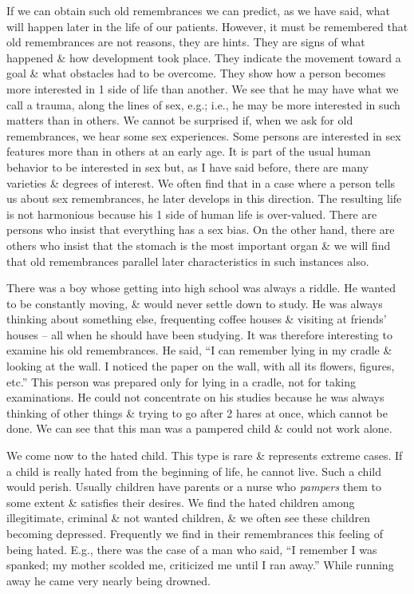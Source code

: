 \documentclass{article}
\numberwithin{equation}{section}
\begin{document}
If we can obtain such old remembrances we can predict, as we have said, what will happen later in the life of our patients. However, it must be remembered that old remembrances are not reasons, they are hints. They are signs of what happened \& how development took place. They indicate the movement toward a goal \& what obstacles had to be overcome. They show how a person becomes more interested in 1 side of life than another. We see that he may have what we call a trauma, along the lines of sex, e.g.; i.e., he may be more interested in such matters than in others. We cannot be surprised if, when we ask for old remembrances, we hear some sex experiences. Some persons are interested in sex features more than in others at an early age. It is part of the usual human behavior to be interested in sex but, as I have said before, there are many varieties \& degrees of interest. We often find that in a case where a person tells us about sex remembrances, he later develops in this direction. The resulting life is not harmonious because his 1 side of human life is over-valued. There are persons who insist that everything has a sex bias. On the other hand, there are others who insist that the stomach is the most important organ \& we will find that old remembrances parallel later characteristics in such instances also.

There was a boy whose getting into high school was always a riddle. He wanted to be constantly moving, \& would never settle down to study. He was always thinking about something else, frequenting coffee houses \& visiting at friends' houses -- all when he should have been studying. It was therefore interesting to examine his old remembrances. He said, ``I can remember lying in my cradle \& looking at the wall. I noticed the paper on the wall, with all its flowers, figures, etc.'' This person was prepared only for lying in a cradle, not for taking examinations. He could not concentrate on his studies because he was always thinking of other things \& trying to go after 2 hares at once, which cannot be done. We can see that this man was a pampered child \& could not work alone.

We come now to the hated child. This type is rare \& represents extreme cases. If a child is really hated from the beginning of life, he cannot live. Such a child would perish. Usually children have parents or a nurse who \textit{pampers} them to some extent \& satisfies their desires. We find the hated children among illegitimate, criminal \& not wanted children, \& we often see these children becoming depressed. Frequently we find in their remembrances this feeling of being hated. E.g., there was the case of a man who said, ``I remember I was spanked; my mother scolded me, criticized me until I ran away.'' While running away he came very nearly being drowned.
\end{document}
